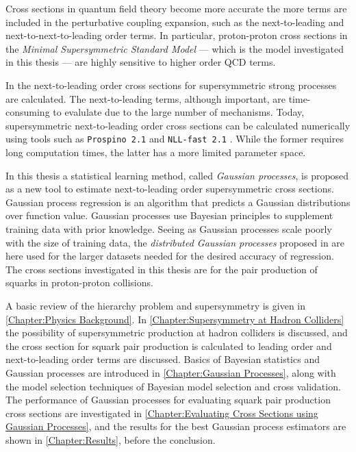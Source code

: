 \documentclass[twoside,english]{uiofysmaster}
\begin{document}
Cross sections in quantum field theory become more accurate the more terms are included in the perturbative coupling expansion, such as the next-to-leading and next-to-next-to-leading order terms. In particular, proton-proton cross sections in the \textit{Minimal Supersymmetric Standard Model} --- which is the model investigated in this thesis --- are highly sensitive to higher order QCD terms.

In \cite{Beenakker:1996ch} the next-to-leading order cross sections for supersymmetric strong processes are calculated. The next-to-leading terms, although important, are time-consuming to evalulate due to the large number of mechanisms. Today, supersymmetric next-to-leading order cross sections can be calculated numerically using tools such as \verb|Prospino 2.1| \cite{Beenakker:1996ed} and \verb|NLL-fast 2.1| \cite{Beenakker:2015rna}. While the former requires long computation times, the latter has a more limited parameter space. 

In this thesis a statistical learning method, called \textit{Gaussian processes}, is proposed as a new tool to estimate next-to-leading order supersymmetric cross sections. Gaussian process regression is an algorithm that predicts a Gaussian distributions over function value. Gaussian processes use Bayesian principles to supplement training data with prior knowledge. Seeing as Gaussian processes scale poorly with the size of training data, the \textit{distributed Gaussian processes} proposed in \cite{deisenroth2015distributed} are here used for the larger datasets needed for the desired accuracy of regression. The cross sections investigated in this thesis are for the pair production of squarks in proton-proton collisions.

A basic review of the hierarchy problem and supersymmetry is given in \autoref{Chapter:Physics Background}. In \autoref{Chapter:Supersymmetry at Hadron Colliders} the possibility of supersymmetric production at hadron colliders is discussed, and the cross section for squark pair production is calculated to leading order and next-to-leading order terms are discussed. Basics of Bayesian statistics and Gaussian processes are introduced in \autoref{Chapter:Gaussian Processes}, along with the model selection techniques of Bayesian model selection and cross validation. The performance of Gaussian processes for evaluating squark pair production cross sections are investigated in \autoref{Chapter:Evaluating Cross Sections using Gaussian Processes}, and the results for the best Gaussian process estimators are shown in \autoref{Chapter:Results}, before the conclusion.
\end{document}
